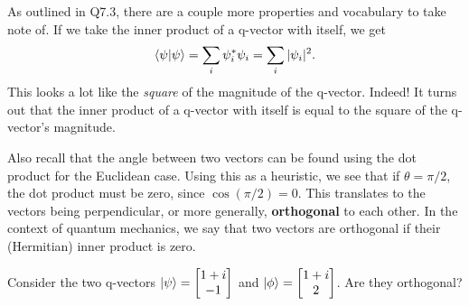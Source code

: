 \documentclass{article}
\begin{document}
    \begin{tcolorbox}[arc=2mm, colback=magenta!15!white, colframe=magenta!80!black, title=\textsc{An Introduction to Complex Numbers (Enrichment)}]

    As outlined in Q7.3, there are a couple more properties and vocabulary to take note of. If we take the inner product of a q-vector with itself, we get 
    \[
    \braket{\psi}{\psi} = \sum_i \psi_i^* \psi_i = \sum_i |\psi_i|^2.
    \]
    This looks a lot like the \textit{square} of the magnitude of the q-vector. Indeed! It turns out that the inner product of a q-vector with itself is equal to the square of the q-vector's magnitude.

    \vspace{1em}

    Also recall that the angle between two vectors can be found using the dot product for the Euclidean case. Using this as a heuristic, we see that if $\theta=\pi / 2$, the dot product must be zero, since $\cos(\pi / 2)=0$. This translates to the vectors being perpendicular, or more generally, \textbf{orthogonal} to each other. In the context of quantum mechanics, we say that two vectors are orthogonal if their (Hermitian) inner product is zero.

    \begin{tcolorbox}[colframe=blue!50!black, arc=2mm, title=\textsc{Practice 3}]
        Consider the two q-vectors $\ket{\psi} = \begin{bmatrix} 1+i \\ -1 \end{bmatrix}$ and $\ket{\phi} = \begin{bmatrix} 1+i \\ 2 \end{bmatrix}$. Are they orthogonal?
    \end{tcolorbox}

    \end{tcolorbox}
\end{document}
